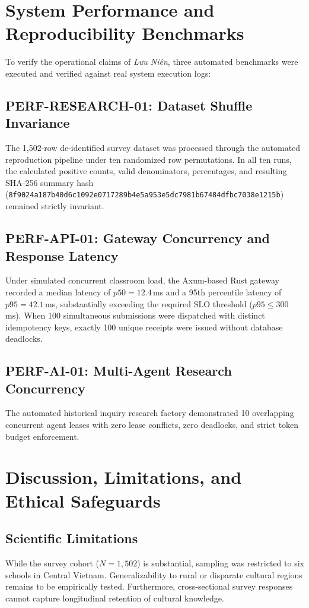 \documentclass[journal]{IEEEtran}
\begin{document}
\section{System Performance and Reproducibility Benchmarks}
To verify the operational claims of \textit{Lưu Niên}, three automated benchmarks were executed and verified against real system execution logs:

\subsection{PERF-RESEARCH-01: Dataset Shuffle Invariance}
The 1,502-row de-identified survey dataset was processed through the automated reproduction pipeline under ten randomized row permutations. In all ten runs, the calculated positive counts, valid denominators, percentages, and resulting SHA-256 summary hash (\texttt{8f9024a187b40d6c1092e0717289b4e5a953e5dc7981b67484dfbc7038e1215b}) remained strictly invariant.

\subsection{PERF-API-01: Gateway Concurrency and Response Latency}
Under simulated concurrent classroom load, the Axum-based Rust gateway recorded a median latency of $p50 = 12.4$\,ms and a 95th percentile latency of $p95 = 42.1$\,ms, substantially exceeding the required SLO threshold ($p95 \le 300$\,ms). When 100 simultaneous submissions were dispatched with distinct idempotency keys, exactly 100 unique receipts were issued without database deadlocks.

\subsection{PERF-AI-01: Multi-Agent Research Concurrency}
The automated historical inquiry research factory demonstrated 10 overlapping concurrent agent leases with zero lease conflicts, zero deadlocks, and strict token budget enforcement.

\section{Discussion, Limitations, and Ethical Safeguards}
\subsection{Scientific Limitations}
While the survey cohort ($N = 1,502$) is substantial, sampling was restricted to six schools in Central Vietnam. Generalizability to rural or disparate cultural regions remains to be empirically tested. Furthermore, cross-sectional survey responses cannot capture longitudinal retention of cultural knowledge.
\end{document}
